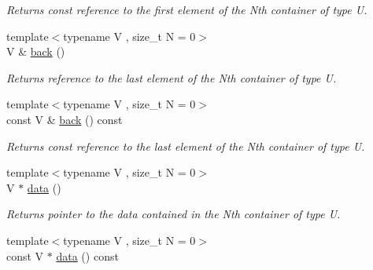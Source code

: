 \begin{DoxyCompactItemize}
\begin{DoxyCompactList}\small\item\em Returns const reference to the first element of the Nth container of type U. \end{DoxyCompactList}\item 
\hypertarget{classheterogeneous_1_1heterovector_3_01_t_00_01_u_00_01_types_8_8_8_4_af49ea1e05541abb8f90032a4cbc13760}{}{\footnotesize template$<$typename V , size\+\_\+t N = 0$>$ }\\V \& \hyperlink{classheterogeneous_1_1heterovector_3_01_t_00_01_u_00_01_types_8_8_8_4_af49ea1e05541abb8f90032a4cbc13760}{back} ()\label{classheterogeneous_1_1heterovector_3_01_t_00_01_u_00_01_types_8_8_8_4_af49ea1e05541abb8f90032a4cbc13760}

\begin{DoxyCompactList}\small\item\em Returns reference to the last element of the Nth container of type U. \end{DoxyCompactList}\item 
\hypertarget{classheterogeneous_1_1heterovector_3_01_t_00_01_u_00_01_types_8_8_8_4_a8485f53e81b698c7b95f2f99c270e950}{}{\footnotesize template$<$typename V , size\+\_\+t N = 0$>$ }\\const V \& \hyperlink{classheterogeneous_1_1heterovector_3_01_t_00_01_u_00_01_types_8_8_8_4_a8485f53e81b698c7b95f2f99c270e950}{back} () const \label{classheterogeneous_1_1heterovector_3_01_t_00_01_u_00_01_types_8_8_8_4_a8485f53e81b698c7b95f2f99c270e950}

\begin{DoxyCompactList}\small\item\em Returns const reference to the last element of the Nth container of type U. \end{DoxyCompactList}\item 
\hypertarget{classheterogeneous_1_1heterovector_3_01_t_00_01_u_00_01_types_8_8_8_4_afc8e106805b5b6b002ca158d5a47f0f3}{}{\footnotesize template$<$typename V , size\+\_\+t N = 0$>$ }\\V $\ast$ \hyperlink{classheterogeneous_1_1heterovector_3_01_t_00_01_u_00_01_types_8_8_8_4_afc8e106805b5b6b002ca158d5a47f0f3}{data} ()\label{classheterogeneous_1_1heterovector_3_01_t_00_01_u_00_01_types_8_8_8_4_afc8e106805b5b6b002ca158d5a47f0f3}

\begin{DoxyCompactList}\small\item\em Returns pointer to the data contained in the Nth container of type U. \end{DoxyCompactList}\item 
\hypertarget{classheterogeneous_1_1heterovector_3_01_t_00_01_u_00_01_types_8_8_8_4_ae2e5da16e135479171df1e27849bb439}{}{\footnotesize template$<$typename V , size\+\_\+t N = 0$>$ }\\const V $\ast$ \hyperlink{classheterogeneous_1_1heterovector_3_01_t_00_01_u_00_01_types_8_8_8_4_ae2e5da16e135479171df1e27849bb439}{data} () const \label{classheterogeneous_1_1heterovector_3_01_t_00_01_u_00_01_types_8_8_8_4_ae2e5da16e135479171df1e27849bb439}


\end{DoxyCompactItemize}
